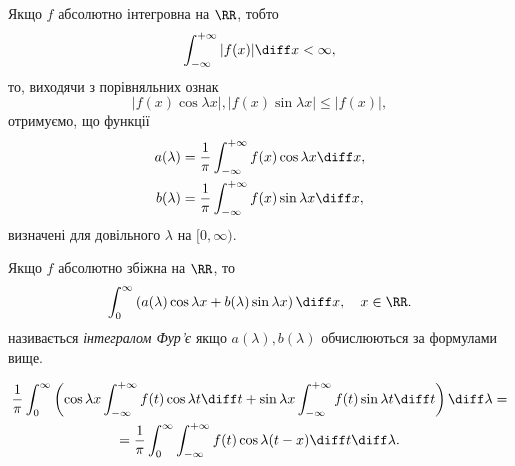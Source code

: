 Якщо $f$ абсолютно інтегровна на $\RR$, тобто
\begin{equation}
    \int_{-\infty}^{+\infty} |f(x)| \diff x < \infty,
\end{equation}
то, виходячи з порівняльних ознак
\begin{equation}
    |f(x) \cos \lambda x|, |f(x) \sin \lambda x| \le |f(x)|,
\end{equation}
отримуємо, що функції
\begin{align}
    a(\lambda) &= \frac{1}{\pi} \int_{-\infty}^{+\infty} f(x) \cos \lambda x \diff x, \\
    b(\lambda) &= \frac{1}{\pi} \int_{-\infty}^{+\infty} f(x) \sin \lambda x \diff x, \\
\end{align}
визначені для довільного $\lambda$ на $[0, \infty)$.

\begin{definition}
    Якщо $f$ абсолютно збіжна на $\RR$, то
    \begin{equation}
        \int_0^\infty \left( a(\lambda) \cos \lambda x + b(\lambda) \sin \lambda x \right) \diff x, \quad x \in \RR.
    \end{equation}
    називається \textit{інтегралом Фур'є} якщо $a(\lambda), b(\lambda)$ обчислюються за формулами вище.
\end{definition}

\begin{multline}
    \frac{1}{\pi} \int_0^\infty \left( \cos \lambda x \int_{-\infty}^{+\infty} f(t) \cos \lambda t \diff t + \sin \lambda x \int_{-\infty}^{+\infty} f(t) \sin \lambda t \diff t \right) \diff \lambda = \\
    = \frac{1}{\pi} \int_0^\infty \int_{-\infty}^{+\infty} f(t) \cos \lambda (t - x) \diff t \diff \lambda.
\end{multline}

